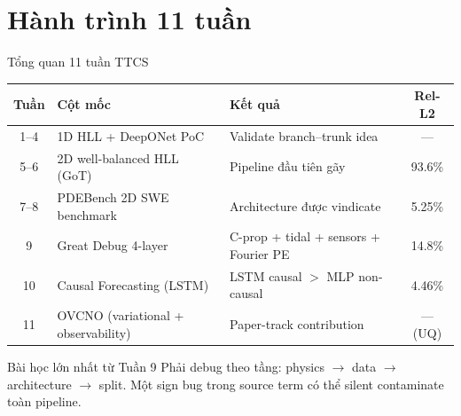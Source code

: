 \documentclass[11pt,aspectratio=169]{beamer}
\begin{document}
\section{Hành trình 11 tuần}

\begin{frame}{Tổng quan 11 tuần TTCS}
  \small
  \begin{tabular}{@{}c l p{6.8cm} c@{}}
    \toprule
    \textbf{Tuần} & \textbf{Cột mốc} & \textbf{Kết quả} & \textbf{Rel-L2} \\
    \midrule
    1--4 & 1D HLL + DeepONet PoC & Validate branch--trunk idea & --- \\
    5--6 & 2D well-balanced HLL (GoT) & Pipeline đầu tiên gãy & 93.6\% \\
    7--8 & PDEBench 2D SWE benchmark & Architecture được vindicate & 5.25\% \\
    \alert{9} & \alert{Great Debug 4-layer} & C-prop + tidal + sensors + Fourier PE & \alert{14.8\%} \\
    10 & Causal Forecasting (LSTM) & LSTM causal $>$ MLP non-causal & 4.46\% \\
    \alert{11} & \alert{OVCNO (variational + observability)} & Paper-track contribution & --- (UQ) \\
    \bottomrule
  \end{tabular}

  \vspace{10pt}
  \begin{block}{Bài học lớn nhất từ Tuần 9}
    Phải debug theo \alert{tầng}: physics $\to$ data $\to$ architecture $\to$ split.
    Một sign bug trong source term có thể silent contaminate toàn pipeline.
  \end{block}
\end{frame}
\end{document}
